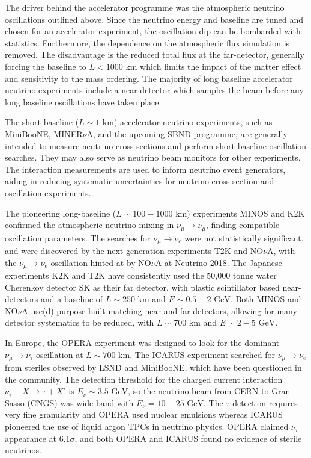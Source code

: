 The driver behind the accelerator programme was the atmospheric neutrino oscillations outlined above. Since the neutrino energy and baseline are tuned and chosen for an accelerator experiment, the oscillation dip can be bombarded with statistics. Furthermore, the dependence on the atmospheric flux simulation is removed\cite{lbnl_review}. The disadvantage is the reduced total flux at the far-detector, generally forcing the baseline to $L<1000\text{ km}$ which limits the impact of the matter effect and sensitivity to the mass ordering. The majority of long baseline accelerator neutrino experiments include a near detector which samples the beam before any long baseline oscillations have taken place.

The short-baseline ($L\sim 1\text{ km}$) accelerator neutrino experiments, such as MiniBooNE\cite{mb_design}, MINER$\nu$A\cite{minerva_design}, and the upcoming SBND programme\cite{sbnd}, are generally intended to measure neutrino cross-sections and perform short baseline oscillation searches. They may also serve as neutrino beam monitors for other experiments. The interaction measurements are used to inform neutrino event generators\cite{neut,genie,NuWro}, aiding in reducing systematic uncertainties for neutrino cross-section and oscillation experiments.

The pioneering long-baseline ($L\sim 100-1000\text{ km}$) experiments MINOS\cite{minos_obs} and K2K\cite{k2k_obs} confirmed the atmospheric neutrino mixing in $\nu_\mu \rightarrow \nu_\mu$, finding compatible oscillation parameters. The searches for $\nu_\mu \rightarrow \nu_e$ were not statistically significant\cite{k2k_noobs,minos_disc}, and were discovered by the next generation experiments T2K\cite{t2k_disc} and NO$\nu$A\cite{nova_disc}, with the $\bar{\nu}_\mu \rightarrow \bar{\nu}_e$ oscillation hinted at by NO$\nu$A at Neutrino 2018\cite{nova_neutrino2018}. The Japanese experiments K2K and T2K have consistently used the 50,000 tonne water Cherenkov detector SK\cite{superk} as their far detector, with plastic scintillator based near-detectors and a baseline of $L\sim250\text{ km}$ and $E\sim0.5-2\text{ GeV}$. Both MINOS and NO$\nu$A use(d) purpose-built matching near and far-detectors, allowing for many detector systematics to be reduced, with $L\sim700\text{ km}$ and $E\sim2-5\text{ GeV}$.

In Europe, the OPERA\cite{opera} experiment was designed to look for the dominant $\nu_\mu \rightarrow \nu_\tau$ oscillation at $L\sim700\text{ km}$. The ICARUS\cite{icarus} experiment searched for $\nu_\mu\rightarrow\nu_e$ from steriles observed by LSND\cite{lsnd} and MiniBooNE\cite{miniboone_sterile}, which have been questioned in the community\cite{lsnd_refute}. The detection threshold for the charged current interaction $\nu_\tau + X \rightarrow \tau + X'$ is $E_\nu\sim 3.5\text{ GeV}$, so the neutrino beam from CERN to Gran Sasso (CNGS)\cite{cngs} was wide-band with $E_\nu = 10-25\text{ GeV}$. The $\tau$ detection requires very fine granularity and OPERA used nuclear emulsions whereas ICARUS pioneered the use of liquid argon TPCs in neutrino physics. OPERA claimed $\nu_\tau$ appearance\cite{opera_final_tau} at 6.1$\sigma$, and both OPERA and ICARUS found no evidence of sterile neutrinos\cite{icarus_lsnd,opera_lsnd}.

